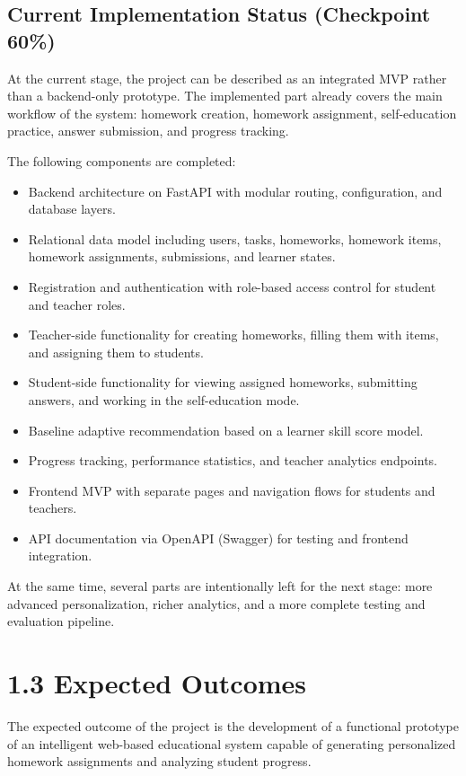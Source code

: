 \documentclass[a4paper,12pt]{extarticle}
\begin{document}
\subsection*{Current Implementation Status (Checkpoint 60\%)}

At the current stage, the project can be described as an integrated MVP rather than a backend-only prototype. The implemented part already covers the main workflow of the system: homework creation, homework assignment, self-education practice, answer submission, and progress tracking.

The following components are completed:

\begin{itemize}
    \item Backend architecture on FastAPI with modular routing, configuration, and database layers.
    \item Relational data model including users, tasks, homeworks, homework items, homework assignments, submissions, and learner states.
    \item Registration and authentication with role-based access control for student and teacher roles.
    \item Teacher-side functionality for creating homeworks, filling them with items, and assigning them to students.
    \item Student-side functionality for viewing assigned homeworks, submitting answers, and working in the self-education mode.
    \item Baseline adaptive recommendation based on a learner skill score model.
    \item Progress tracking, performance statistics, and teacher analytics endpoints.
    \item Frontend MVP with separate pages and navigation flows for students and teachers.
    \item API documentation via OpenAPI (Swagger) for testing and frontend integration.
\end{itemize}

At the same time, several parts are intentionally left for the next stage: more advanced personalization, richer analytics, and a more complete testing and evaluation pipeline.

\section*{1.3 Expected Outcomes}

The expected outcome of the project is the development of a functional prototype of an intelligent web-based educational system capable of generating personalized homework assignments and analyzing student progress.
\end{document}
